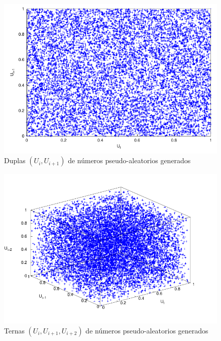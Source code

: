 \documentclass{sig-alternate}
\begin{document}
\begin{figure}[hp]
\centering
\includegraphics[scale=0.8]{graficos/duplas}
\caption{Duplas $(U_{i}, U_{i+1})$ de n\'{u}meros pseudo-aleatorios generados}
\label{fig:duplas}
\end{figure}

\begin{figure}[hp]
\centering
\includegraphics[scale=0.8]{graficos/ternas}
\caption{Ternas $(U_{i}, U_{i+1}, U_{i+2})$ de n\'{u}meros pseudo-aleatorios
generados}
\label{fig:ternas}
\end{figure}
\end{document}
